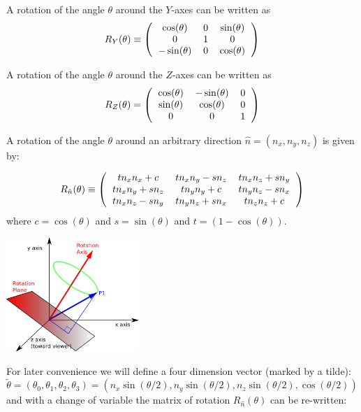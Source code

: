 \documentclass[12pt]{article}
\begin{document}
A rotation of the angle $\theta$ around the $Y$-axes can be written as
\begin{equation}
R_Y(\theta) \equiv \left(\begin{tabular}{ccc}
$\cos(\theta)$ & 0 & $\sin(\theta)$ \\
0 & 1 & 0 \\
$-\sin(\theta)$ & 0 & $\cos(\theta)$ 
\end{tabular}\right)
\end{equation}

A rotation of the angle $\theta$ around the $Z$-axes can be written as
\begin{equation}
R_Z(\theta) = \left(\begin{tabular}{ccc}
$\cos(\theta)$ & $-\sin(\theta)$ & 0 \\
$\sin(\theta)$ & $\cos(\theta)$ & 0 \\
0 & 0 & 1
\end{tabular}\right)
\end{equation}

A rotation of the angle $\theta$ around an arbitrary direction $\hat n = (n_x,n_y,n_z)$ is given by:

\begin{equation}
R_{\hat n}(\theta) \equiv \left(\begin{tabular}{ccc} 
$t n_x n_x+c$ & $t n_x n_y-s n_z$ & $t n_x n_z+s n_y$ \\
$t n_x n_y+s n_z$ & $t n_y n_y+c$ & $t n_y n_z-s n_x$ \\
$t n_x n_z-s n_y$ & $t n_y n_z+s n_x$ & $t n_z n_z+c$
\end{tabular}\right)
\end{equation}
where $c=\cos(\theta)$ and $s=\sin(\theta)$ and $t=(1-\cos(\theta))$.

\begin{center}
\includegraphics[width=5cm]{images/rotation.png}
\end{center}

For later convenience we will define a four dimension vector (marked by a tilde):
\begin{equation}
\tilde \theta = (\theta_0,\theta_1,\theta_2,\theta_3) = (n_x \sin(\theta/2), n_y \sin(\theta/2), n_z \sin(\theta/2),\cos(\theta/2))
\label{quaternion}
\end{equation}
and with a change of variable the matrix of rotation $R_{\hat n}(\theta)$ can be re-written:
\end{document}
